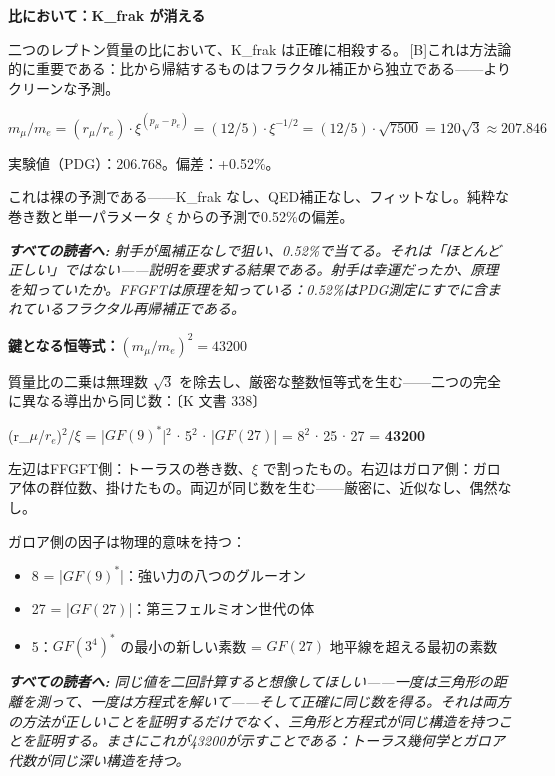\documentclass[11pt,openany]{book}
\newcommand{\status}[1]{\penalty10000\,{\tiny\textcolor{gray!70}{[#1]}}}
\newenvironment{laierspur}{%
  \par\vspace{4pt}%
  \noindent\small\itshape\color{blue!60!black}%
  \textbf{すべての読者へ:}\enspace\ignorespaces}{%
  \par\vspace{4pt}\normalsize\normalfont\normalcolor}
\begin{document}
\textbf{比において：K\_frak が消える}

二つのレプトン質量の比において、K\_frak は正確に相殺する。\status{B}これは方法論的に重要である：比から帰結するものはフラクタル補正から独立である——よりクリーンな予測。

$m_\mu/m_e = (r_\mu/r_e)\cdot\xi^{(p_\mu - p_e)} = (12/5)\cdot\xi^{-1/2} = (12/5)\cdot\sqrt{7500} = 120\sqrt{3} \approx 207.846$

実験値（PDG）：206.768。偏差：+0.52\%。

これは裸の予測である——K\_frak なし、QED補正なし、フィットなし。純粋な巻き数と単一パラメータ $\xi$ からの予測で0.52\%の偏差。

\begin{laierspur}
射手が風補正なしで狙い、0.52\%で当てる。それは「ほとんど正しい」ではない——説明を要求する結果である。射手は幸運だったか、原理を知っていたか。FFGFTは原理を知っている：0.52\%はPDG測定にすでに含まれているフラクタル再帰補正である。
\end{laierspur}

\textbf{鍵となる恒等式：$(m_\mu/m_e)^2 = 43200$}

質量比の二乗は無理数 $\sqrt{3}$ を除去し、厳密な整数恒等式を生む——二つの完全に異なる導出から同じ数：〔K 文書 338〕

(r\_$\mu$/$r_e$)$^2$/$\xi$ = |$GF(9)^*$|$^2$ $\cdot$ 5$^2$ $\cdot$ |$GF(27)$| = 8$^2$ $\cdot$ 25 $\cdot$ 27 = \textbf{43200}

左辺はFFGFT側：トーラスの巻き数、$\xi$ で割ったもの。右辺はガロア側：ガロア体の群位数、掛けたもの。両辺が同じ数を生む——厳密に、近似なし、偶然なし。

ガロア側の因子は物理的意味を持つ：
\begin{itemize}
\item 8 = |$GF(9)^*$|：強い力の八つのグルーオン
\item 27 = |$GF(27)$|：第三フェルミオン世代の体
\item 5：$GF(3^4)^*$ の最小の新しい素数 = $GF(27)$ 地平線を超える最初の素数
\end{itemize}

\begin{laierspur}
同じ値を二回計算すると想像してほしい——一度は三角形の距離を測って、一度は方程式を解いて——そして正確に同じ数を得る。それは両方の方法が正しいことを証明するだけでなく、三角形と方程式が同じ構造を持つことを証明する。まさにこれが43200が示すことである：トーラス幾何学とガロア代数が同じ深い構造を持つ。
\end{laierspur}
\end{document}
